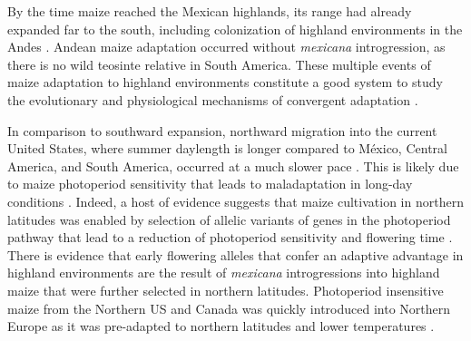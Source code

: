 \documentclass[9pt,twocolumn,twoside,lineno]{BioRxiv}
\begin{document}
By the time maize reached the Mexican highlands, its range had already expanded far to the south, including colonization of highland environments in the  Andes \cite{Athens2016-ep, Grobman2012-pm}. 
Andean maize adaptation occurred without \textit{mexicana} introgression, as there is no wild teosinte relative in South America.
These multiple events of maize adaptation to highland environments constitute a good system to study the evolutionary and physiological mechanisms of convergent adaptation \cite{Takuno2015-uj, Wang2020-mp}.

In comparison to southward expansion, northward migration into the current United States, where summer daylength is longer compared to México, Central America, and South America, occurred at a much slower pace \cite{Da_Fonseca2015-zh, Swarts2017-ge}.
This is likely due to maize photoperiod sensitivity that leads to maladaptation in long-day conditions \cite{Hung2012-ms}. 
Indeed, a host of evidence suggests that maize cultivation in northern latitudes was enabled by selection of allelic variants of genes in the photoperiod pathway that lead to a reduction of photoperiod sensitivity and flowering time \cite{Liang2018-af, Guo2018-on, Coles2010-db, Huang2018-ga, Yang2013-lg, Salvi2007-ku, Hung2012-ms}.
There is evidence that early flowering alleles that confer an adaptive advantage in highland environments are the result of \textit{mexicana} introgressions into highland maize \cite{Guo2018-on} that were further selected in northern latitudes.
Photoperiod insensitive maize from the Northern US and Canada was quickly introduced into Northern Europe as it was pre-adapted to northern latitudes and lower temperatures \cite{Brandenburg2017-ii}.
\end{document}
